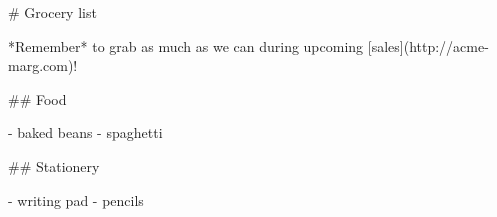 \documentclass{article}
\begin{document}
\begin{markdown}
# Grocery list

*Remember* to grab as much as we can during upcoming [sales](http://acme-marg.com)!

## Food

- baked beans
- spaghetti

## Stationery 

- writing pad
- pencils
\end{markdown}
\end{document}
